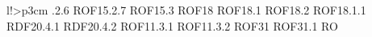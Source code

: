 \begin{tabella}{l!{\VRule}>{\centering\arraybackslash}p{3cm}}
.2.6 \linebreak ROF15.2.7 \linebreak ROF15.3 \linebreak ROF18 \linebreak ROF18.1 \linebreak ROF18.2 \linebreak ROF18.1.1 \linebreak RDF20.4.1 \linebreak RDF20.4.2 \linebreak ROF11.3.1 \linebreak ROF11.3.2 \linebreak ROF31 \linebreak ROF31.1 \linebreak RO
\end{tabella}
